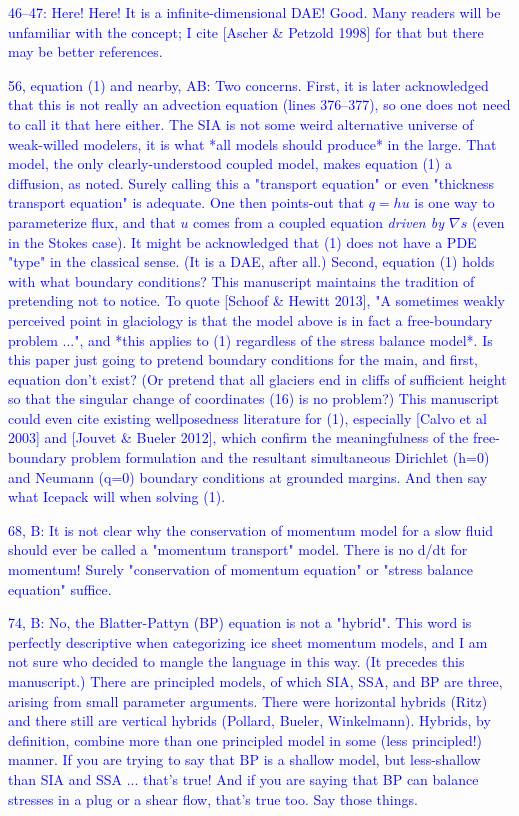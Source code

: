 \documentclass{article}
\theoremstyle{definition}
\theoremstyle{plain}
\begin{document}
\textcolor{blue}{46--47:  Here!  Here!  It is a infinite-dimensional DAE!  Good.  Many readers will be unfamiliar with the concept; I cite [Ascher \& Petzold 1998] for that but there may be better references.}

\textcolor{blue}{56, equation (1) and nearby, AB:  Two concerns.  First, it is later acknowledged that this is not really an advection equation (lines 376--377), so one does not need to call it that here either.  The SIA is not some weird alternative universe of weak-willed modelers, it is what *all models should produce* in the large.  That model, the only clearly-understood coupled model, makes equation (1) a diffusion, as noted.  Surely calling this a "transport equation" or even "thickness transport equation" is adequate.  One then points-out that $q=hu$ is one way to parameterize flux, and that $u$ comes from a coupled equation \emph{driven by $\nabla s$} (even in the Stokes case).  It might be acknowledged that (1) does not have a PDE "type" in the classical sense.  (It is a DAE, after all.)  Second, equation (1) holds with what boundary conditions?  This manuscript maintains the tradition of pretending not to notice.  To quote [Schoof \& Hewitt 2013], "A sometimes weakly perceived point in glaciology is that the model above is in fact a free-boundary problem ...", and *this applies to (1) regardless of the stress balance model*.  Is this paper just going to pretend boundary conditions for the main, and first, equation don't exist?  (Or pretend that all glaciers end in cliffs of sufficient height so that the singular change of coordinates (16) is no problem?)  This manuscript could even cite existing wellposedness literature for (1), especially [Calvo et al 2003] and [Jouvet \& Bueler 2012], which confirm the meaningfulness of the free-boundary problem formulation and the resultant simultaneous Dirichlet (h=0) and Neumann (q=0) boundary conditions at grounded margins.  And then say what Icepack will when solving (1).}

\textcolor{blue}{68, B:  It is not clear why the conservation of momentum model for a slow fluid should ever be called a "momentum transport" model.  There is no d/dt for momentum!  Surely "conservation of momentum equation" or "stress balance equation" suffice.}

\textcolor{blue}{74, B:  No, the Blatter-Pattyn (BP) equation is not a "hybrid".  This word is perfectly descriptive when categorizing ice sheet momentum models, and I am not sure who decided to mangle the language in this way.  (It precedes this manuscript.)  There are principled models, of which SIA, SSA, and BP are three, arising from small parameter arguments.  There were horizontal hybrids (Ritz) and there still are vertical hybrids (Pollard, Bueler, Winkelmann).  Hybrids, by definition, combine more than one principled model in some (less principled!) manner.  If you are trying to say that BP is a shallow model, but less-shallow than SIA and SSA ... that's true!  And if you are saying that BP can balance stresses in a plug or a shear flow, that's true too.  Say those things.}
\end{document}

